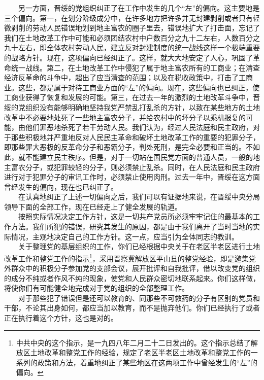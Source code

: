 \documentclass[cn,11pt,chinese]{elegantbook}
\begin{document}
　　另一方面，晋绥的党组织纠正了在工作中发生的几个“左”的偏向。这主要地是三个偏向。第一，在划分阶级成分中，在许多地方把许多并无封建剥削或者只有轻微剥削的劳动人民错误地划到地主富农的圈子里去，错误地扩大了打击面，忘记了我们在土地改革工作中可能和必须团结农村中户数百分之九十二左右，人数百分之九十左右，即全体农村劳动人民，建立反对封建制度的统一战线这样一个极端重要的战略方针。现在，这项偏向已经纠正了。这样，就大大地安定了人心，巩固了革命统一战线。第二，在土地改革工作中侵犯了属于地主富农所有的工商业；在清查经济反革命的斗争中，超出了应当清查的范围；以及在税收政策中，打击了工商业。这些，都是属于对待工商业方面的“左”的偏向。现在，这些偏向也已纠正，使工商业获得了恢复和发展的可能。第三，在过去一年的激烈的土地改革斗争中，晋绥的党组织没有能够明确地坚持我党严禁乱打乱杀的方针，以致在某些地方的土地改革中不必要地处死了一些地主富农分子，并给农村中的坏分子以乘机报复的可能，由他们罪恶地杀死了若干劳动人民。我们认为，经过人民法庭和民主政府，对于那些积极地并严重地反对人民民主革命和破坏土地改革工作的重要的犯罪分子，即那些罪大恶极的反革命分子和恶霸分子，判处死刑，是完全必要和正当的。不如此，就不能建立民主秩序。但是，对于一切站在国民党方面的普通人员，一般的地主富农分子，或犯罪较轻的分子，则必须禁止乱杀。同时，在人民法庭和民主政府进行对于犯罪分子的审讯工作时，必须禁止使用肉刑。过去一年中，晋绥在这方面曾经发生的偏向，现在也已纠正了。\\
　　在认真地纠正了上述一切偏向之后，我们可以有证据地来说，在晋绥中央分局领导下面的全部工作，现在已经走上了健全发展的轨道。\\
　　按照实际情况决定工作方针，这是一切共产党员所必须牢牢记住的最基本的工作方法。我们所犯的错误，研究其发生的原因，都是由于我们离开了当时当地的实际情况，主观地决定自己的工作方针。这一点，应当引为全体同志的教训。\\
　　关于整理党的基层组织的工作，你们已经根据中央关于在老区半老区进行土地改革工作和整党工作的指示\footnote[1]{ 中共中央的这个指示，是一九四八年二月二十二日发出的。这个指示总结了解放区土地改革和整党工作的经验，规定了老区半老区土地改革和整党工作的一系列的政策和方法，着重地纠正了某些地区在这两项工作中曾经发生的“左”的偏向。}，采用晋察冀解放区平山县的整党经验，即是邀集党外群众中的积极分子参加党的支部会议，展开批评和自我批评，借以改变党的组织的成分不纯或者作风不纯的现象，使党和人民群众密切地联系起来。你们这样做，将使你们有可能健全地完成对于党的组织的全部整理工作。\\
　　对于那些犯了错误但是还可以教育的、同那些不可救药的分子有区别的党员和干部，不论其出身如何，都应当加以教育，而不是抛弃他们。你们已经执行了或者正在执行着这个方针，这也是对的。\\
\end{document}
